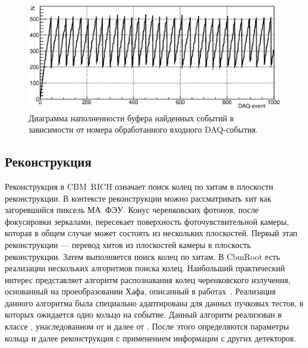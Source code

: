 \begin{figure}[H]
\includegraphics[width=1.0\textwidth]{pictures/16_Buff.eps}
\caption{Диаграмма наполненности буфера найденных событий в зависимости от номера обработанного входного DAQ-события.}
\label{fig:Buffer}
\end{figure}

\subsection{Реконструкция}

Реконструкция в CBM~RICH означает поиск колец по хитам в плоскости реконструкции. В контексте реконструкции можно рассматривать хит как загоревшийся пиксель МА~ФЭУ. Конус черенковских фотонов, после фокусировки зеркалами, пересекает поверхность фоточувствительной камеры, которая в общем случае может состоять из нескольких плоскостей. Первый этап реконструкции --- перевод хитов из плоскостей камеры в плоскость реконструкции. Затем выполняется поиск колец по хитам. В CbmRoot есть реализации нескольких алгоритмов поиска колец. Наибольший практический интерес представляет алгоритм распознавания колец черенковского излучения, основанный на проеобразовании Хафа, описанный в работах~\cite{RECOPEPAN, RECO2}. Реализация данного алгоритма была специально адаптирована для данных пучковых тестов, в которых ожидается одно кольцо на событие. Данный алгоритм реализован в классе , унаследованном от  и далее от . После этого определяются параметры кольца и далее реконструкция с применением информации с других детекторов.
